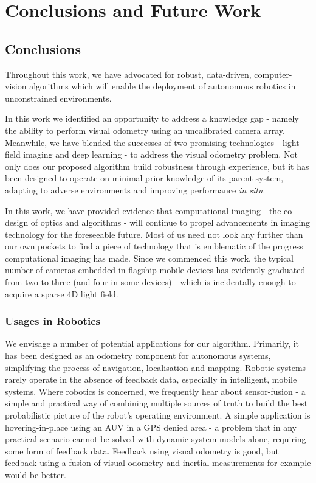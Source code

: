\chapter{Conclusions and Future Work}


\section{Conclusions}
Throughout this work, we have advocated for robust, data-driven, computer-vision algorithms which will enable the deployment of autonomous robotics in unconstrained environments. 

In this work we identified an opportunity to address a knowledge gap - namely the ability to perform visual odometry using an uncalibrated camera array. Meanwhile, we have blended the successes of two promising technologies - light field imaging and deep learning - to address the visual odometry problem.  Not only does our proposed algorithm build robustness through experience, but it has been designed to operate on minimal prior knowledge of its parent system, adapting to adverse environments and improving performance \textit{in situ}. 

In this work, we have provided evidence that computational imaging - the co-design of optics and algorithms - will continue to propel advancements in imaging technology for the foreseeable future. Most of us need not look any further than our own pockets to find a piece of technology that is emblematic of the progress computational imaging has made. Since we commenced this work, the typical number of cameras embedded in flagship mobile devices has evidently graduated from two to three (and four in some devices) - which is incidentally enough to acquire a sparse 4D light field.

\subsection{Usages in Robotics}
We envisage a number of potential applications for our algorithm. Primarily, it has been designed as an odometry component for autonomous systems, simplifying the process of navigation, localisation and mapping. Robotic systems rarely operate in the absence of feedback data, especially in intelligent, mobile systems. Where robotics is concerned, we frequently hear about sensor-fusion - a simple and practical way of combining multiple sources of truth to build the best probabilistic picture of the robot's operating environment. A simple application is hovering-in-place using an AUV in a GPS denied area - a problem that in any practical scenario cannot be solved with dynamic system models alone, requiring some form of feedback data. Feedback using visual odometry is good, but feedback using a fusion of visual odometry and inertial measurements for example would be better. 


